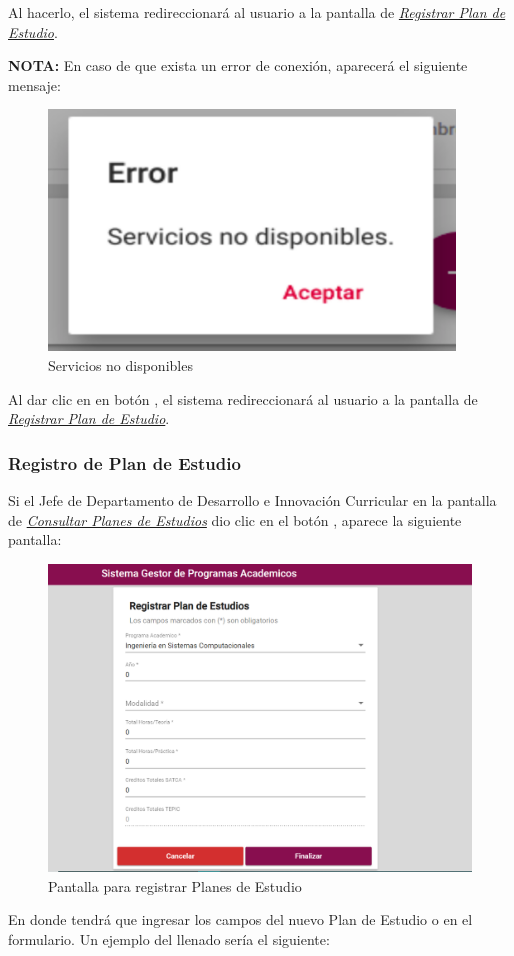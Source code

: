 Al hacerlo, el sistema redireccionará al usuario a la pantalla de \hyperlink{registrarPE}{\textit{Registrar Plan de Estudio}}.


\textbf{NOTA:} En caso de que exista un error de conexión, aparecerá el siguiente mensaje:
	\begin{figure}[!hbtp]
	\centering
	\hypertarget{error}{\includegraphics[width=0.7\linewidth]{images/SP4-GPE/error}}
	\caption{Servicios no disponibles}
	\label{error}
\end{figure}

Al dar clic en en botón , el sistema redireccionará al usuario a la pantalla de \hyperlink{registrarPE}{\textit{Registrar Plan de Estudio}}. 
\newpage
\subsubsection{Registro de Plan de Estudio}
Si el Jefe de Departamento de Desarrollo e Innovación Curricular en la pantalla de \hyperlink{consultarPE}{\textit{Consultar Planes de Estudios}} dio clic en el botón \IUbutton{+}, aparece la siguiente pantalla:

\begin{figure}[!hbtp]
	\centering
	\hypertarget{registrarPE}{\includegraphics[width=0.7\linewidth]{images/SP4-GPE/registrarPE}}
	\caption{Pantalla para registrar Planes de Estudio}
	\label{registrarPE}
\end{figure}
\newpage
En donde tendrá que ingresar los campos del nuevo Plan de Estudio o en el formulario. Un ejemplo del llenado sería el siguiente:

